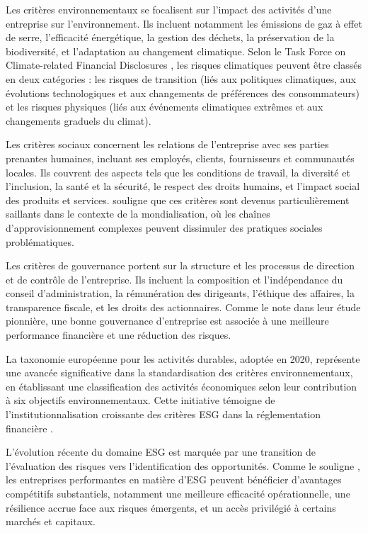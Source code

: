 Les critères environnementaux se focalisent sur l'impact des activités d'une entreprise sur l'environnement. Ils incluent notamment les émissions de gaz à effet de serre, l'efficacité énergétique, la gestion des déchets, la préservation de la biodiversité, et l'adaptation au changement climatique. Selon le Task Force on Climate-related Financial Disclosures \citep{task2017}, les risques climatiques peuvent être classés en deux catégories : les risques de transition (liés aux politiques climatiques, aux évolutions technologiques et aux changements de préférences des consommateurs) et les risques physiques (liés aux événements climatiques extrêmes et aux changements graduels du climat).

Les critères sociaux concernent les relations de l'entreprise avec ses parties prenantes humaines, incluant ses employés, clients, fournisseurs et communautés locales. Ils couvrent des aspects tels que les conditions de travail, la diversité et l'inclusion, la santé et la sécurité, le respect des droits humains, et l'impact social des produits et services. \citet{hopkins2016} souligne que ces critères sont devenus particulièrement saillants dans le contexte de la mondialisation, où les chaînes d'approvisionnement complexes peuvent dissimuler des pratiques sociales problématiques.

Les critères de gouvernance portent sur la structure et les processus de direction et de contrôle de l'entreprise. Ils incluent la composition et l'indépendance du conseil d'administration, la rémunération des dirigeants, l'éthique des affaires, la transparence fiscale, et les droits des actionnaires. Comme le note \citet{gompers2003} dans leur étude pionnière, une bonne gouvernance d'entreprise est associée à une meilleure performance financière et une réduction des risques.

La taxonomie européenne pour les activités durables, adoptée en 2020, représente une avancée significative dans la standardisation des critères environnementaux, en établissant une classification des activités économiques selon leur contribution à six objectifs environnementaux. Cette initiative témoigne de l'institutionnalisation croissante des critères ESG dans la réglementation financière \citep{commission2019}.

L'évolution récente du domaine ESG est marquée par une transition de l'évaluation des risques vers l'identification des opportunités. Comme le souligne \citet{khan2016}, les entreprises performantes en matière d'ESG peuvent bénéficier d'avantages compétitifs substantiels, notamment une meilleure efficacité opérationnelle, une résilience accrue face aux risques émergents, et un accès privilégié à certains marchés et capitaux.

